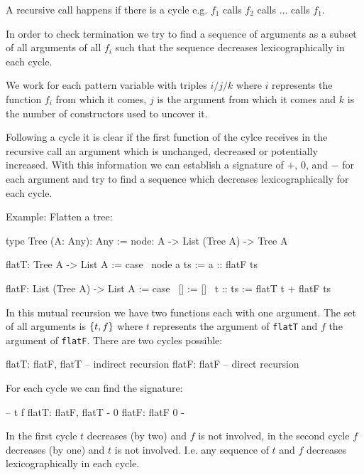A recursive call happens if there is a cycle e.g. $f_1$ calls $f_2$ calls $\ldots$
calls $f_1$.

In order to check termination we try to find a sequence of arguments as a subset
of all arguments of all $f_i$ such that the sequence decreases lexicographically
in each cycle.

We work for each pattern variable with triples $i/j/k$ where $i$ represents the
function $f_i$ from which it comes, $j$ is the argument from which it comes and
$k$ is the number of constructors used to uncover it.

Following a cycle it is clear if the first function of the cylce receives in the
recursive call an argument which is unchanged, decreased or potentially
increased. With this information we can establish a signature of $+$, $0$, and
$-$ for each argument and try to find a sequence which decreases
lexicographically for each cycle.


Example: Flatten a tree:

\begin{alba}
    type Tree (A: Any): Any :=
        node: A -> List (Tree A) -> Tree A

    flatT: Tree A -> List A := case
        \ node a ts := a :: flatF ts

    flatF: List (Tree A) -> List A := case
        \ []         :=  []
        \ t :: ts    :=  flatT t + flatF ts
\end{alba}

In this mutual recursion we have two functions each with one argument. The set
of all arguments is ${\{t, f\}}$ where $t$ represents the argument of
\lstinline!flatT! and $f$ the argument of \lstinline!flatF!. There are two cycles
possible:
\begin{alba}
    flatT: flatF, flatT             -- indirect recursion
    flatF: flatF                    -- direct recursion
\end{alba}

For each cycle we can find the signature:
\begin{alba}
    --                                 t           f
    flatT: flatF, flatT                -           0
    flatF: flatF                       0           -
\end{alba}

In the first cycle $t$ decreases (by two) and $f$ is not involved, in the second
cycle $f$ decreases (by one) and $t$ is not involved. I.e. any sequence of $t$
and $f$ decreases lexicographically in each cycle.




